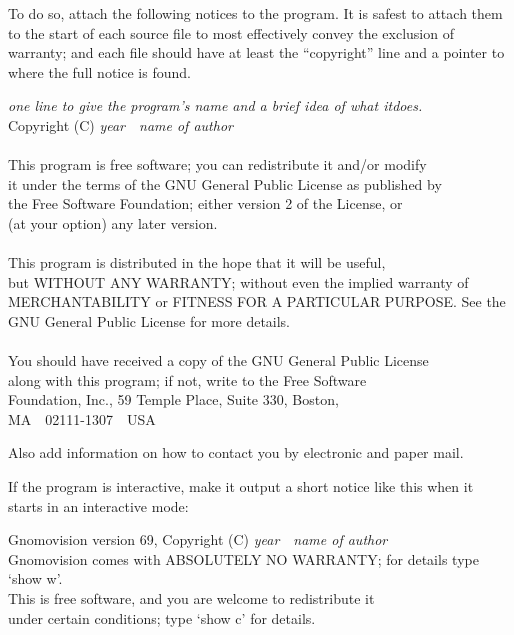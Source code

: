 \documentclass{uw-wkrpt}
\begin{document}
\begin{appendices}
\begin{singlespacing}
  To do so, attach the following notices to the program.  It is safest
to attach them to the start of each source file to most effectively
convey the exclusion of warranty; and each file should have at least
the ``copyright'' line and a pointer to where the full notice is found.
\renewenvironment{quote}{\list{}{}\item\relax}{\endlist}
\begin{quote}\ttfamily\footnotesize
    \emph{one line to give the program's name and a brief 
    idea of what it\nolinebreak[4] does.}\\
    Copyright (C) \emph{year}\ \ \emph{name of author}\\
\mbox{}\\
    This program is free software; you can redistribute it and/or modify\\
    it under the terms of the GNU General Public License as published by\\
    the Free Software Foundation; either version 2 of the License, or\\
    (at your option) any later version.\\
\mbox{}\\
    This program is distributed in the hope that it will be useful,\\
    but WITHOUT ANY WARRANTY; without even the implied warranty of\\
    MERCHANTABILITY or FITNESS FOR A PARTICULAR PURPOSE.  See the\\
    GNU General Public License for more details.\\
\mbox{}\\
    You should have received a copy of the GNU General Public License\\
    along with this program; if not, write to the Free Software\\
    Foundation, Inc., 59 Temple Place, Suite 330, Boston, \\
    MA\ \ 02111-1307\ \ USA
\end{quote}


Also add information on how to contact you by electronic and paper mail.

If the program is interactive, make it output a short notice like this
when it starts in an interactive mode:
\begin{quote}\ttfamily\footnotesize
    Gnomovision version 69, Copyright (C) \emph{year}\ \ 
    \emph{name of author}\\
    Gnomovision comes with ABSOLUTELY NO WARRANTY; for details type `show w'.\\
    This is free software, and you are welcome to redistribute it\\
    under certain conditions; type `show c' for details.
\end{quote}


\end{singlespacing}
\end{appendices}
\end{document}
